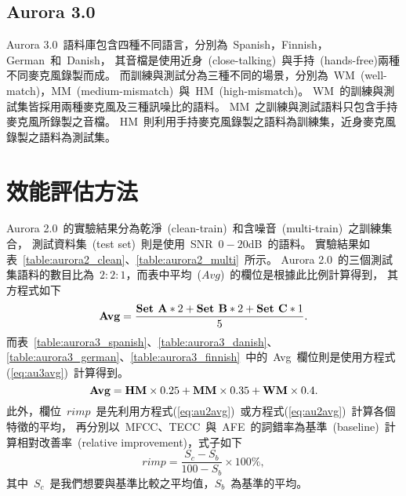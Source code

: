 \subsection{Aurora 3.0}
Aurora 3.0~語料庫包含四種不同語言，分別為~Spanish，Finnish，German~和~Danish，
其音檔是使用近身~(close-talking)~與手持~(hands-free)兩種不同麥克風錄製而成。
而訓練與測試分為三種不同的場景，分別為~WM~(well-match)，MM~(medium-mismatch)~與~HM~(high-mismatch)。
WM~的訓練與測試集皆採用兩種麥克風及三種訊噪比的語料。
MM~之訓練與測試語料只包含手持麥克風所錄製之音檔。
HM~則利用手持麥克風錄製之語料為訓練集，近身麥克風錄製之語料為測試集。

\section{效能評估方法}
\label{sec:performance}
Aurora 2.0~的實驗結果分為乾淨~(clean-train)~和含噪音~(multi-train)~之訓練集合，
測試資料集~(test set)~則是使用~SNR~$0-20$dB~的語料。
實驗結果如表~\ref{table:aurora2_clean}、\ref{table:aurora2_multi}~所示。
Aurora 2.0~的三個測試集語料的數目比為~$2:2:1$，而表中平均~($Avg$)~的欄位是根據此比例計算得到，
其方程式如下
\begin{equation}
  \text{\bf Avg} = \frac{\text{\bf Set A}*2+\text{\bf Set
      B}*2+\text{\bf Set C}*1}{5}.
\label{eq:au2avg}      
\end{equation}
而表~\ref{table:aurora3_spanish}、\ref{table:aurora3_danish}、\ref{table:aurora3_german}、\ref{table:aurora3_finnish}~中的~Avg~欄位則是使用方程式(\ref{eq:au3avg})~計算得到。
\begin{equation}
  \text{\bf Avg} = \text{\bf HM} \times 0.25 + \text{\bf MM} \times 0.35 + \text{\bf WM} \times 0.4. 
\label{eq:au3avg}      
\end{equation}
此外，欄位~$rimp$~是先利用方程式(\ref{eq:au2avg})~或方程式(\ref{eq:au2avg})~計算各個特徵的平均，
再分別以~MFCC、TECC~與~AFE~的詞錯率為基準~(baseline)~計算相對改善率~(relative improvement)，式子如下
\begin{equation}
	rimp = \frac{S_c-S_b}{100-S_b}\times 100\%,
\label{eq:rimp}
\end{equation}
其中~$S_c$~是我們想要與基準比較之平均值，$S_b$~為基準的平均。

